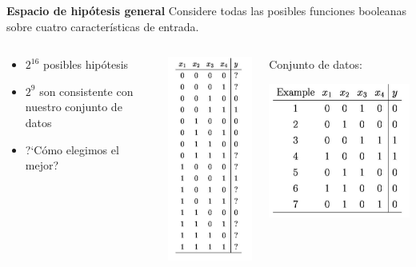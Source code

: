 \documentclass[11pt]{beamer}
\begin{document}
\begin{frame}{\textbf{\textcolor{red!55!green}{Espacio de hip\'otesis general}}}
Considere todas las posibles funciones booleanas sobre cuatro caracter\'isticas de entrada.

\vspace{0.2cm}

	\begin{columns}
		\begin{column}{0.4\textwidth}
			\begin{itemize}
				\item $2^{16}$ posibles hip\'otesis
				\item $2^9$ son consistente con nuestro conjunto de datos
				\item ?`C\'omo elegimos el mejor?
			\end{itemize}
		\end{column}
		\begin{column}{0.3\textwidth}  
		\includegraphics[scale= 0.4]{ML7.png}
		\end{column}
		
		\begin{column}{0.3\textwidth}  
		Conjunto de datos:
		
		\includegraphics[scale= 0.25]{ML6.png}	
		\end{column}
	\end{columns}
\end{frame}
\end{document}
